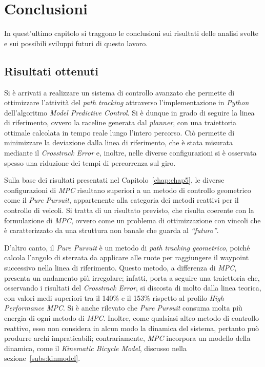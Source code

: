 \chapter{Conclusioni}
In quest'ultimo capitolo si traggono le conclusioni sui risultati delle analisi svolte e
sui possibili sviluppi futuri di questo lavoro.

\label{chap:chap6}
\section{Risultati ottenuti}
Si è arrivati a realizzare un sistema di controllo avanzato che permette di 
ottimizzare l'attività del \textit{path tracking} attraverso l'implementazione
in \textit{Python} dell'algoritmo \textit{Model Predictive Control}.
Si è dunque in grado di seguire la linea di riferimento, ovvero la raceline generata dal \textit{planner}, con una 
traiettoria ottimale calcolata in tempo reale lungo l'intero percorso. Ciò permette di 
minimizzare la deviazione dalla linea di riferimento, che è stata misurata mediante il 
\textit{Crosstrack Error} e, inoltre, nelle diverse configurazioni si è osservata spesso una
riduzione dei tempi di percorrenza sul giro.

Sulla base dei risultati presentati nel Capitolo~\ref{chap:chap5}, le diverse configurazioni di
\textit{MPC} risultano superiori a un metodo di controllo geometrico come il 
\textit{Pure Pursuit}, appartenente alla categoria dei metodi reattivi per il controllo di veicoli. 
Si tratta di un risultato previsto, che risulta coerente con la formulazione di \textit{MPC}, 
ovvero come un problema di ottimizzazione con vincoli che è caratterizzato da una struttura 
non banale che guarda al \textit{``futuro''}. 

D'altro canto, il \textit{Pure Pursuit} è un metodo di \textit{path tracking geometrico}, poiché 
calcola l'angolo di sterzata da applicare alle ruote per raggiungere il waypoint successivo nella linea di riferimento. 
Questo metodo, a differenza di \textit{MPC}, presenta un andamento più irregolare; infatti, 
porta a seguire una traiettoria che, osservando i risultati del \textit{Crosstrack Error},
si discosta di molto dalla linea teorica, con valori medi superiori tra il 140\% e il 153\%
rispetto al profilo \textit{High Performance MPC}.
Si è anche rilevato che \textit{Pure Pursuit} consuma molta più energia di ogni metodo di 
\textit{MPC}. Inoltre, come qualsiasi altro metodo di controllo reattivo, esso non considera in
alcun modo la dinamica del sistema, pertanto può produrre archi impraticabili; contrariamente, 
\textit{MPC} incorpora un modello della dinamica, come il \textit{Kinematic Bicycle Model}, discusso nella sezione~\ref{subs:kinmodel}.

